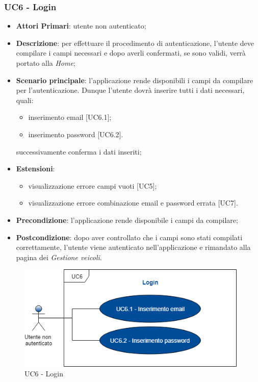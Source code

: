 \subsubsection{UC6 - Login}
\begin{itemize}
	\item \textbf{Attori Primari}: utente non autenticato;
	\item \textbf{Descrizione}: per effettuare il procedimento di autenticazione, l'utente deve compilare i campi necessari e dopo averli confermati, se sono validi, verrà portato alla \textit{Home};
	\item \textbf{Scenario principale}: l'applicazione rende disponibili i campi da compilare per l'autenticazione. Dunque l'utente dovrà inserire tutti i dati necessari, quali:
	\begin{itemize}
		\item inserimento email [UC6.1];
		\item inserimento password [UC6.2].
	\end{itemize}
	successivamente conferma i dati inseriti;
	\item \textbf{Estensioni}:
	\begin{itemize}
		\item visualizzazione errore campi vuoti [UC5];
		\item visualizzazione errore combinazione email e password errata [UC7].
	\end{itemize}
	\item \textbf{Precondizione}: l'applicazione rende disponibile i campi da compilare;
	\item \textbf{Postcondizione}: dopo aver controllato che i campi sono stati compilati correttamente, l'utente viene autenticato nell'applicazione e rimandato alla pagina dei \textit{Gestione veicoli}.	
\end{itemize}
\begin{figure}[h]
	\includegraphics[width=11cm]{res/images/UC6Login.png}
	\centering
	\caption{UC6 - Login}
\end{figure}
